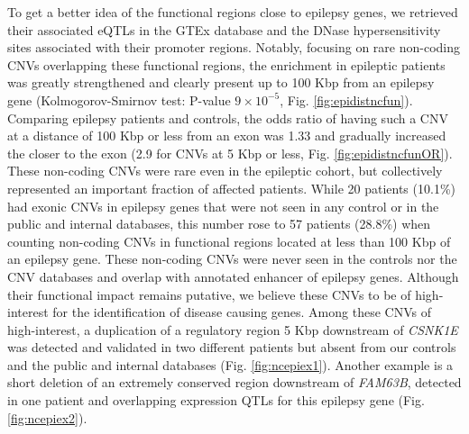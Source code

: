 To get a better idea of the functional regions close to epilepsy genes, we retrieved their associated eQTLs in the GTEx database\cite{Ardlie2015} and the DNase hypersensitivity sites associated with their promoter regions\cite{Maurano2012}.
Notably, focusing on rare non-coding CNVs overlapping these functional regions, the enrichment in epileptic patients was greatly strengthened and clearly present up to 100 Kbp from an epilepsy gene (Kolmogorov-Smirnov test: P-value $9\times10^{-5}$, Fig. \ref{fig:epidistncfun}).
Comparing epilepsy patients and controls, the odds ratio of having such a CNV at a distance of 100 Kbp or less from an exon was 1.33 and gradually increased the closer to the exon (2.9 for CNVs at 5 Kbp or less, Fig. \ref{fig:epidistncfunOR}).
These non-coding CNVs were rare even in the epileptic cohort, but collectively represented an important fraction of affected patients.
While 20 patients (10.1\%) had exonic CNVs in epilepsy genes that were not seen in any control or in the public and internal databases, this number rose to 57 patients (28.8\%) when counting non-coding CNVs in functional regions located at less than 100 Kbp of an epilepsy gene. %
These non-coding CNVs were never seen in the controls nor the CNV databases and overlap with annotated enhancer of epilepsy genes.
Although their functional impact remains putative, we believe these CNVs to be of high-interest for the identification of disease causing genes.
Among these CNVs of high-interest, a duplication of a regulatory region 5 Kbp downstream of {\it CSNK1E} was detected and validated in two different patients but absent from our controls and the public and internal databases (Fig. \ref{fig:ncepiex1}).
Another example is a short deletion of an extremely conserved region downstream of {\it FAM63B}, detected in one patient and overlapping expression QTLs for this epilepsy gene (Fig. \ref{fig:ncepiex2}).

